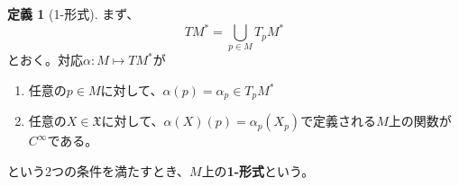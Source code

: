 \documentclass[unicode,a4paper,11pt]{ltjsarticle}
\theoremstyle{definition}
\newtheorem{dfn}{定義}[section]
\renewcommand{\theequation}{$\thesection.\arabic{equation}$}
\renewcommand{\thefigure}{\thesection.\arabic{figure}}
\renewcommand{\thetable}{\thesection.\arabic{table}}
\begin{document}
\begin{dfn}[1-形式]
  まず、
  \begin{equation}
    TM^{\ast}
    =
    \bigcup_{p\in M}T_{p}M^{\ast}
  \end{equation}
  とおく。対応$\alpha:M\mapsto TM^{\ast}$が
  \begin{enumerate}
    \item 
    任意の$p\in M$に対して、$\alpha(p)=\alpha_{p}\in T_{p}M^{\ast}$
    \item 
    任意の$X\in \mathfrak{X}$に対して、$\alpha(X)(p)=\alpha_{p}(X_{p})$で定義される$M$上の関数が$C^{\infty}$である。
  \end{enumerate}
  という2つの条件を満たすとき、$M$上の\textbf{1-形式}という。
\end{dfn}































\clearpage



\nocite{Mogi:2001}
\nocite{Nakahara:2003}
\end{document}
